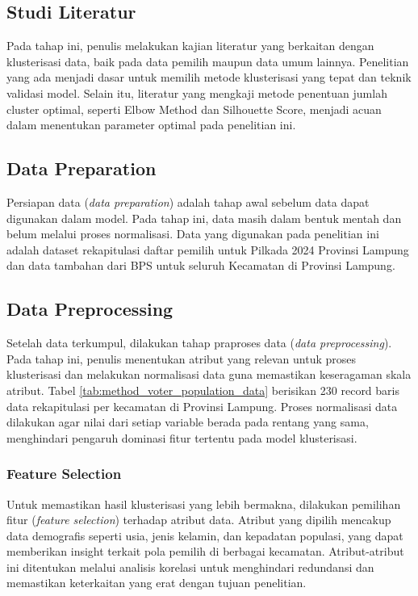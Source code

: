 \subsection{Studi Literatur}
Pada tahap ini, penulis melakukan kajian literatur yang berkaitan dengan klusterisasi data, baik pada data pemilih maupun data umum lainnya. Penelitian yang ada menjadi dasar untuk memilih metode klusterisasi yang tepat dan teknik validasi model. Selain itu, literatur yang mengkaji metode penentuan jumlah cluster optimal, seperti Elbow Method dan Silhouette Score, menjadi acuan dalam menentukan parameter optimal pada penelitian ini.

\subsection{Data Preparation}
Persiapan data (\textit{data preparation}) adalah tahap awal sebelum data dapat digunakan dalam model. Pada tahap ini, data masih dalam bentuk mentah dan belum melalui proses normalisasi. Data yang digunakan pada penelitian ini adalah dataset rekapitulasi daftar pemilih untuk Pilkada 2024 Provinsi Lampung dan data tambahan dari BPS  untuk seluruh Kecamatan di Provinsi Lampung.


\subsection{Data Preprocessing}
Setelah data terkumpul, dilakukan tahap praproses data (\textit{data preprocessing}). Pada tahap ini, penulis menentukan atribut yang relevan untuk proses klusterisasi dan melakukan normalisasi data guna memastikan keseragaman skala atribut. Tabel \ref{tab:method_voter_population_data} berisikan 230 record baris data rekapitulasi per kecamatan di Provinsi Lampung. Proses normalisasi data dilakukan agar nilai dari setiap variable berada pada rentang yang sama, menghindari pengaruh dominasi fitur tertentu pada model klusterisasi.

\subsubsection{Feature Selection}
Untuk memastikan hasil klusterisasi yang lebih bermakna, dilakukan pemilihan fitur (\textit{feature selection}) terhadap atribut data. Atribut yang dipilih mencakup data demografis seperti usia, jenis kelamin, dan kepadatan populasi, yang dapat memberikan insight terkait pola pemilih di berbagai kecamatan. Atribut-atribut ini ditentukan melalui analisis korelasi untuk menghindari redundansi dan memastikan keterkaitan yang erat dengan tujuan penelitian.


